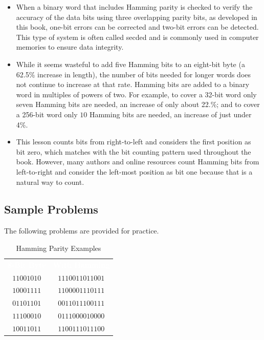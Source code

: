\begin{itemize}
  \item When a binary word that includes Hamming parity is checked to verify the accuracy of the data bits using three overlapping parity bits, as developed in this book, one-bit errors can be corrected and two-bit errors can be detected. This type of system is often called \gls{secded} and is commonly used in computer memories to ensure data integrity.

  \item While it seems wasteful to add five Hamming bits to an eight-bit byte (a 62.5\% increase in length), the number of bits needed for longer words does not continue to increase at that rate. Hamming bits are added to a binary word in multiples of powers of two. For example, to cover a 32-bit word only seven Hamming bits are needed, an increase of only about 22.\%; and to cover a 256-bit word only $ 10 $ Hamming bits are needed, an increase of just under 4\%.

  \item This lesson counts bits from right-to-left and considers the first position as bit zero, which matches with the bit counting pattern used throughout the book. However, many authors and online resources count Hamming bits from left-to-right and consider the left-most position as bit one because that is a natural way to count.
\end{itemize}

\subsection{Sample Problems}
\label{CL:subsec:sample_problems_error_detection}

The following problems are provided for practice. 

\begin{table}[H]
  \sffamily
  \newcommand{\head}[1]{\textcolor{white}{\textbf{#1}}}    
  \begin{center}
    \begin{tabular}{cc} 
      \rowcolor{black!75}
      \head{8-Bit Byte} & \head{With Hamming} \\
      $ 11001010 $ & $ 1110011011001 $ \\
      $ 10001111 $ & $ 1100001110111 $ \\
      $ 01101101 $ & $ 0011011100111 $ \\
      $ 11100010 $ & $ 0111000010000 $ \\
      $ 10011011 $ & $ 1100111011100 $ \\
    \end{tabular}
  \end{center}
  \caption{Hamming Parity Examples}
  \label{CL:tab:hamming_parity_examples}
\end{table}

